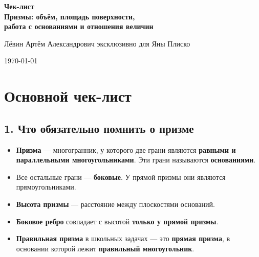 \documentclass[a4paper,12pt]{article}
\begin{document}
\begin{titlepage}
\thispagestyle{empty}
\begin{center}
\vspace*{2.8cm}

{\Large\bfseries\textcolor{darkaccent}{Чек-лист}}\\[0.6cm]
{\LARGE\bfseries Призмы: объём, площадь поверхности,}\\[0.2cm]
{\LARGE\bfseries работа с основаниями и отношения величин}

\vspace{2.2cm}

{\large Лёвин Артём Александрович эксклюзивно для Яны Плиско}

\vspace{0.9cm}

{\large \today}

\vfill


\end{center}
\end{titlepage}

\section*{Основной чек-лист}

\subsection*{1. Что обязательно помнить о призме}

\begin{itemize}
    \item \textbf{Призма} --- многогранник, у которого две грани являются \textbf{равными и параллельными многоугольниками}. Эти грани называются \textbf{основаниями}.
    \item Все остальные грани --- \textbf{боковые}. У прямой призмы они являются прямоугольниками.
    \item \textbf{Высота призмы} --- расстояние между плоскостями оснований.
    \item \textbf{Боковое ребро} совпадает с высотой \textbf{только у прямой призмы}.
    \item \textbf{Правильная призма} в школьных задачах --- это \textbf{прямая призма}, в основании которой лежит \textbf{правильный многоугольник}.
\end{itemize}
\end{document}
